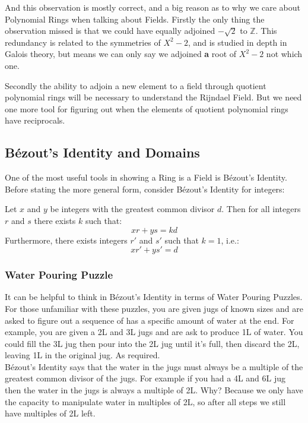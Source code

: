 And this observation is mostly correct,
and a big reason as to why we care about Polynomial Rings when talking about Fields.
Firstly the only thing the observation missed is that we could have equally adjoined $-\sqrt{2}$ to $\mathbb{Z}$.
This redundancy is related to the symmetries of $X^2-2$,
and is studied in depth in Galois theory,
but means we can only say we adjoined {\bf a} root of $X^2-2$ not which one.

Secondly the ability to adjoin a new element to a field through quotient polynomial rings will be necessary to understand the Rijndael Field.
But we need one more tool for figuring out when the elements of quotient polynomial rings have reciprocals.

\subsection{Bézout's Identity and Domains}
One of the most useful tools in showing a Ring is a Field is Bézout's Identity.
Before stating the more general form, consider Bézout's Identity for integers:
\begin{displayquote}
Let $x$ and $y$ be integers with the greatest common divisor $d$.
Then for all integers $r$ and $s$ there exists $k$ such that:
	\[xr+ys=kd\]
Furthermore,
there exists integers $r'$ and $s'$ such that $k=1$, i.e.:
	\[xr'+ys'=d\]
\end{displayquote}

\subsubsection{Water Pouring Puzzle}
It can be helpful to think in Bézout's Identity in terms of Water Pouring Puzzles.
For those unfamiliar with these puzzles,
you are given jugs of known sizes and are asked to figure out a sequence of has a specific amount of water at the end.
For example, you are given a 2L and 3L jugs and are ask to produce 1L of water.
You could fill the 3L jug then pour into the 2L jug until it's full, then discard the 2L, leaving 1L in the original jug. 
As required.
\\

Bézout's Identity says that the water in the jugs must always be a multiple of the greatest common divisor of the jugs.
For example if you had a 4L and 6L jug then the water in the jugs is always a multiple of 2L.
Why?
Because we only have the capacity to manipulate water in multiples of 2L,
so after all steps we still have multiples of 2L left.
\\

